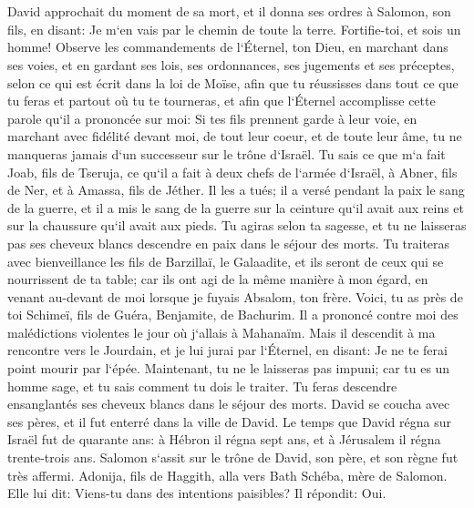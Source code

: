 \chapter{}

\verse David approchait du moment de sa mort, et il donna ses ordres à Salomon, son fils, en disant: 
\verse Je m`en vais par le chemin de toute la terre. Fortifie-toi, et sois un homme! 
\verse Observe les commandements de l`Éternel, ton Dieu, en marchant dans ses voies, et en gardant ses lois, ses ordonnances, ses jugements et ses préceptes, selon ce qui est écrit dans la loi de Moïse, afin que tu réussisses dans tout ce que tu feras et partout où tu te tourneras, 
\verse et afin que l`Éternel accomplisse cette parole qu`il a prononcée sur moi: Si tes fils prennent garde à leur voie, en marchant avec fidélité devant moi, de tout leur coeur, et de toute leur âme, tu ne manqueras jamais d`un successeur sur le trône d`Israël. 
\verse Tu sais ce que m`a fait Joab, fils de Tseruja, ce qu`il a fait à deux chefs de l`armée d`Israël, à Abner, fils de Ner, et à Amassa, fils de Jéther. Il les a tués; il a versé pendant la paix le sang de la guerre, et il a mis le sang de la guerre sur la ceinture qu`il avait aux reins et sur la chaussure qu`il avait aux pieds. 
\verse Tu agiras selon ta sagesse, et tu ne laisseras pas ses cheveux blancs descendre en paix dans le séjour des morts. 
\verse Tu traiteras avec bienveillance les fils de Barzillaï, le Galaadite, et ils seront de ceux qui se nourrissent de ta table; car ils ont agi de la même manière à mon égard, en venant au-devant de moi lorsque je fuyais Absalom, ton frère. 
\verse Voici, tu as près de toi Schimeï, fils de Guéra, Benjamite, de Bachurim. Il a prononcé contre moi des malédictions violentes le jour où j`allais à Mahanaïm. Mais il descendit à ma rencontre vers le Jourdain, et je lui jurai par l`Éternel, en disant: Je ne te ferai point mourir par l`épée. 
\verse Maintenant, tu ne le laisseras pas impuni; car tu es un homme sage, et tu sais comment tu dois le traiter. Tu feras descendre ensanglantés ses cheveux blancs dans le séjour des morts. 
\verse David se coucha avec ses pères, et il fut enterré dans la ville de David. 
\verse Le temps que David régna sur Israël fut de quarante ans: à Hébron il régna sept ans, et à Jérusalem il régna trente-trois ans. 
\verse Salomon s`assit sur le trône de David, son père, et son règne fut très affermi. 
\verse Adonija, fils de Haggith, alla vers Bath Schéba, mère de Salomon. Elle lui dit: Viens-tu dans des intentions paisibles? Il répondit: Oui. 
